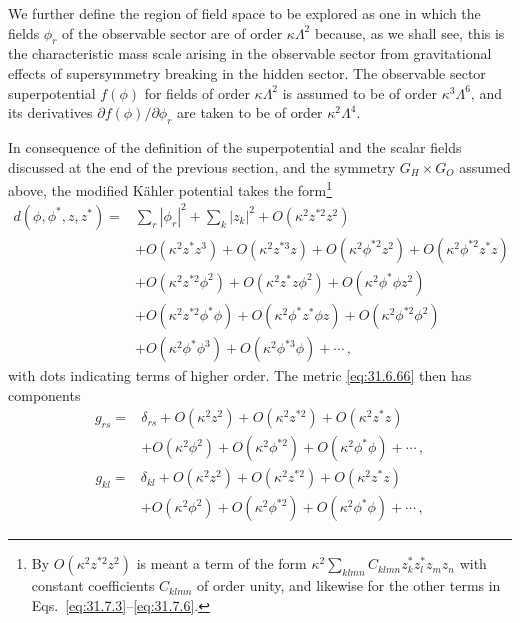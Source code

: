 We further define the region of field space to be explored as one in which
the fields \(\phi_r\) of the observable sector are of order
\(\kappa\Lambda^2\) because, as we shall see, this is the characteristic
mass scale arising in the observable sector from gravitational effects of
supersymmetry breaking in the hidden sector. The observable sector
superpotential \(f(\phi)\) for fields of order \(\kappa\Lambda^2\) is
assumed to be of order \(\kappa^3\Lambda^6\), and its derivatives
\(\partial f(\phi)/\partial\phi_r\) are taken to be of order
\(\kappa^2\Lambda^4\).

In consequence of the definition of the superpotential and the scalar
fields discussed at the end of the previous section, and the symmetry
\(G_H\times G_O\) assumed above, the modified Kähler potential takes the
form\footnote{By \(O(\kappa^2z^{*2}z^2)\) is meant a term of the form
\(\kappa^2\sum_{klmn}C_{klmn}z_k^*z_l^*z_mz_n\) with constant coefficients
\(C_{klmn}\) of order unity, and likewise for the other terms in
Eqs.~\eqref{eq:31.7.3}--\eqref{eq:31.7.6}.}
\begin{equation}
  \begin{aligned}
  d(\phi,\phi^*,z,z^*)={}&
    \sum_r|\phi_r|^2+\sum_k|z_k|^2+O(\kappa^2z^{*2}z^2)
  \\
  &+O(\kappa^2z^*z^3)+O(\kappa^2z^{*3}z)
    +O(\kappa^2\phi^{*2}z^2)+O(\kappa^2\phi^{*2}z^*z)
  \\
  &+O(\kappa^2z^{*2}\phi^2)+O(\kappa^2z^*z\phi^2)
    +O(\kappa^2\phi^*\phi z^2)
  \\
  &+O(\kappa^2z^{*2}\phi^*\phi)
    +O(\kappa^2\phi^*z^*\phi z)+O(\kappa^2\phi^{*2}\phi^2)
  \\
  &+O(\kappa^2\phi^*\phi^3)+O(\kappa^2\phi^{*3}\phi)+\cdots\,,
  \end{aligned}
  \tag{31.7.3}\label{eq:31.7.3}
\end{equation}
with dots indicating terms of higher order. The metric \eqref{eq:31.6.66}
then has components
\begin{equation}
  \begin{aligned}
  g_{rs}={}&\delta_{rs}
  +O(\kappa^2z^2)+O(\kappa^2z^{*2})+O(\kappa^2z^*z)
  \\
  &+O(\kappa^2\phi^2)+O(\kappa^2\phi^{*2})
  +O(\kappa^2\phi^*\phi)+\cdots\,,
  \end{aligned}
  \tag{31.7.4}\label{eq:31.7.4}
\end{equation}
\begin{equation}
  \begin{aligned}
  g_{kl}={}&\delta_{kl}
  +O(\kappa^2z^2)+O(\kappa^2z^{*2})+O(\kappa^2z^*z)
  \\
  &+O(\kappa^2\phi^2)+O(\kappa^2\phi^{*2})
  +O(\kappa^2\phi^*\phi)+\cdots\,,
  \end{aligned}
  \tag{31.7.5}\label{eq:31.7.5}
\end{equation}
